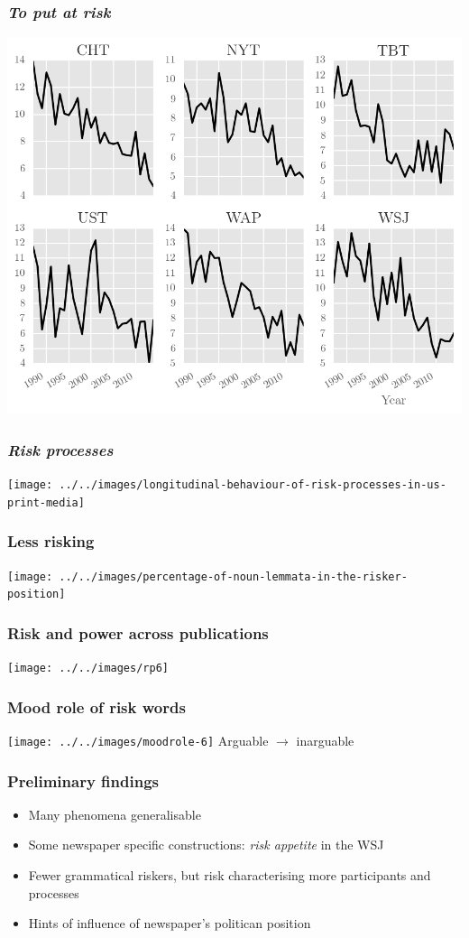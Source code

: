 \documentclass{beamer}       %
\begin{document}
\begin{frame}\frametitle{\emph{To put at risk}}
    \centering
    \includegraphics[width=.9\textwidth]{../../images/to-run-risk}
\end{frame}

\begin{frame}\frametitle{\emph{Risk processes}}
    \centering
    \texttt{[image: ../../images/longitudinal-behaviour-of-risk-processes-in-us-print-media]}
\end{frame}

\begin{frame}\frametitle{Less risking}
    \centering
    \texttt{[image: ../../images/percentage-of-noun-lemmata-in-the-risker-position]}
\end{frame}

\begin{frame}\frametitle{Risk and power across publications}
    \centering
    \texttt{[image: ../../images/rp6]}
\end{frame}

\begin{frame}
    \frametitle{Mood role of risk words}
    \centering
    \texttt{[image: ../../images/moodrole-6]}
    Arguable $\rightarrow$ inarguable
\end{frame}


\begin{frame}\frametitle{Preliminary findings}
\begin{itemize}
    \item Many phenomena generalisable
    \item Some newspaper specific constructions: \emph{risk appetite} in the WSJ
    \item Fewer grammatical riskers, but risk characterising more participants and processes
    \item Hints of influence of newspaper's politican position
\end{itemize}
\end{frame}
\end{document}
